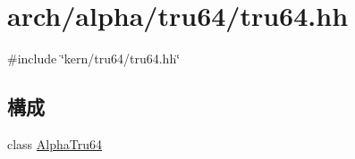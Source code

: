 \hypertarget{arch_2alpha_2tru64_2tru64_8hh}{
\section{arch/alpha/tru64/tru64.hh}
\label{arch_2alpha_2tru64_2tru64_8hh}
}
{\ttfamily \#include \char`\"{}kern/tru64/tru64.hh\char`\"{}}\par
\subsection*{構成}
\begin{DoxyCompactItemize}
\item 
class \hyperlink{classAlphaTru64}{AlphaTru64}
\end{DoxyCompactItemize}
